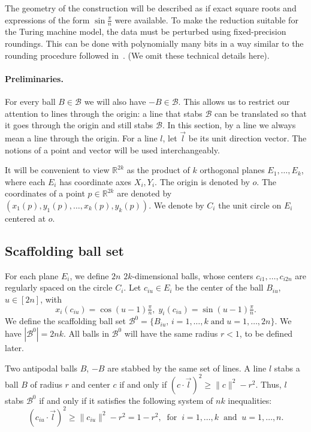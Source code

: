 \documentclass[12pt]{article}
\def\Reals{\ensuremath{\mathbb{R}}}
\newcommand{\R}{\mathbb{R}}
\begin{document}
The geometry of the construction
will be described as if
exact square roots and expressions of the form $\sin\frac{\pi}{n}$
were available.  To make the reduction suitable for the Turing machine
model, the data must be perturbed using fixed-precision roundings.  This
can be done with polynomially many bits in a way similar to the
rounding procedure followed in~\cite{CGKR08, cgkmr-gcfpt-09}. (We omit these technical details here).

\paragraph{Preliminaries.}
For every ball $B\in\mathcal{B}$ we will also have $-B\in\mathcal{B}$. This allows us to restrict our attention to lines 
through the origin: a line that stabs $\mathcal{B}$ can be translated so that it goes through 
the origin and still stabs $\mathcal{B}$. In this section, by a line we always mean a line through the origin. 
For a line $l$, let $\vec{l}$ be its unit direction vector. 
The notions of a point and vector will be used interchangeably.

It will be convenient to
view $\Reals^{2k}$ as the product of $k$ orthogonal planes $E_1,\dots, E_k$,
where each $E_i$ has coordinate axes $X_i,Y_i$. The origin is denoted by $o$.
The coordinates of a point $p\in\R^{2k}$ are denoted by $\left(x_1(p), y_1(p),\ldots ,x_k(p), y_k(p)\right)$.
We denote by $C_i$ the unit circle on $E_i$ centered at $o$.

\subsection{Scaffolding ball set}
\label{scaff}
For each plane $E_i$, we define $2n$ $2k$-dimensional balls, 
whose centers $c_{i1},\ldots ,c_{i2n}$ are regularly spaced on the circle $C_i$.
Let $c_{iu}\in E_i$ be the center of the ball $B_{iu}$, $u\in[2n]$, with  
$$
x_i(c_{iu})=\cos(u-1)\tfrac{\pi}{n},\; y_i(c_{iu})=\sin(u-1)\tfrac{\pi}{n}.
$$
We define the scaffolding ball set $\mathcal{B}^0=\{B_{iu},\, i=1,\ldots,k \;\mathrm{and}\; u=1,\ldots,2n\}$. 
We have $|\mathcal{B}^0|=2nk$. All balls in $\mathcal{B}^0$ will have the same radius $r<1$, to be defined later.

Two antipodal balls $B$, $-B$ are stabbed by the same set of lines.
A line $l$ stabs a ball $B$ of radius $r$ and center $c$ if and only if $(c\cdot \vec{l})^2\geq \lVert c\rVert^2-r^2$. 
Thus, $l$ stabs $\mathcal{B}^0$ if and only if it satisfies the following system of $nk$ inequalities:
\begin{equation}
\nonumber (c_{iu}\cdot \vec{l})^2\geq \lVert c_{iu}\rVert^2-r^2=1-r^2, 
\;\;\text{for}\;\;
i=1,\ldots,k
\;\;\text{and}\;\;
u=1,\ldots,n. 
\end{equation}
\end{document}
